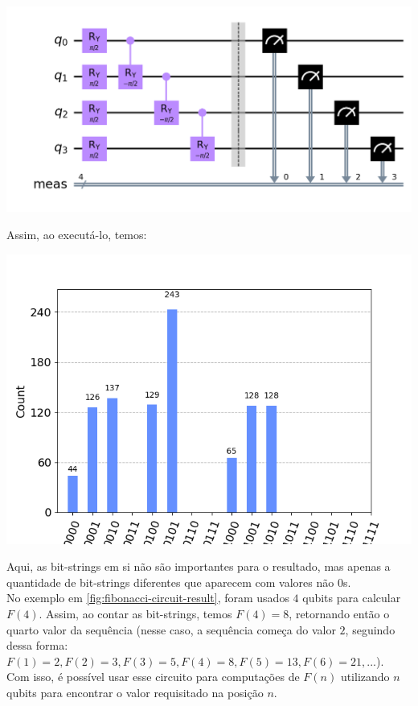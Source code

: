 \documentclass{article}
\begin{document}
\begin{center}
	\includegraphics[scale=0.3]{fibonacci-circuit.png}
	\label{fig:fibonacci-circuit}
\end{center}

Assim, ao executá-lo, temos:

\begin{center}
	\includegraphics[scale=0.5]{fibonacci-4.png}
	\label{fig:fibonacci-circuit-result}
\end{center}

Aqui, as bit-strings em si não são importantes para o resultado, mas apenas a quantidade de bit-strings diferentes que aparecem com valores não $0$s.\\ 
No exemplo em \ref{fig:fibonacci-circuit-result}, foram usados $4$ qubits para calcular $F(4)$. Assim, ao contar as bit-strings, temos $F(4) = 8$, retornando então o quarto valor da sequência (nesse caso, a sequência começa do valor $2$, seguindo dessa forma: $F(1)=2, F(2)=3, F(3)=5, F(4)=8, F(5)=13, F(6)=21, ...$). \\
Com isso, é possível usar esse circuito para computações de $F(n)$ utilizando $n$ qubits para encontrar o valor requisitado na posição $n$.
\end{document}
